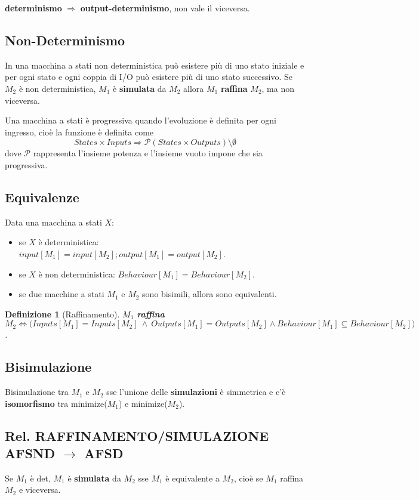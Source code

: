 \documentclass[a4paper, 11pt]{article}
\newtheorem{definit}{Definizione}[subsection]
\begin{document}
\begin{center}
\textbf{determinismo} $\Rightarrow$ \textbf{output-determinismo}, non vale il viceversa.
\end{center}

\subsection{Non-Determinismo}
In una macchina a stati non deterministica può esistere più di uno stato iniziale e per ogni stato e ogni coppia di I/O può esistere più di uno stato successivo. Se $M_2$ è non deterministica, $M_1$ è \textbf{simulata} da $M_2$ allora $M_1$ \textbf{raffina} $M_2$, ma non viceversa.


Una macchina a stati è progressiva quando l'evoluzione è definita per ogni ingresso, cioè la funzione è definita come \[States \times Inputs \Rightarrow \mathcal{P}(States \times Outputs) \setminus \emptyset \] dove $\mathcal{P}$ rappresenta l'insieme potenza e l'insieme vuoto impone che sia progressiva.

\subsection{Equivalenze}
Data una macchina a stati $X$:
\begin{itemize}
\item se $X$ è deterministica: $input[M_1]=input[M_2]; output[M_1]=output[M_2]$.
\item se $X$ è non deterministica: $Behaviour[M_1]=Behaviour[M_2]$.
\item se due macchine a stati $M_1$ e $M_2$ sono bisimili, allora sono equivalenti.
\end{itemize}

\begin{definit}[Raffinamento]
	$M_1$ \textbf{raffina} $M_2 \Leftrightarrow  \Big(Inputs[M_1]=Inputs[M_2]\ \wedge\ Outputs[M_1]=Outputs[M_2] \wedge Behaviour[M_1] \subseteq Behaviour[M_2]\Big)$.
\end{definit}


\subsection{Bisimulazione}
Bisimulazione tra $M_1$ e $M_2$ sse l'unione delle \textbf{simulazioni} è simmetrica e c'è \textbf{isomorfismo} tra minimize($M_1$) e minimize($M_2$).

\subsection{Rel. RAFFINAMENTO/SIMULAZIONE AFSND $\rightarrow$ AFSD} Se $M_1$ è det, $M_1$ è \textbf{simulata} da $M_2$ sse $M_1$ è equivalente a $M_2$, cioè se $M_1$ raffina $M_2$ e viceversa.
\end{document}
